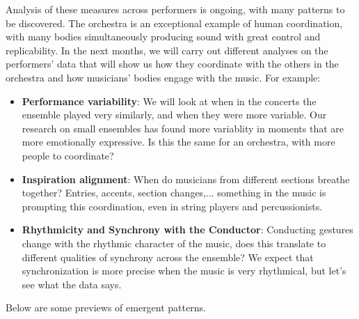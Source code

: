 Analysis of these measures across performers is ongoing, with many patterns to be discovered. The orchestra is an exceptional example of human coordination, with many bodies simultaneously producing sound with great control and replicability. In the next months, we will carry out different analyses on the performers' data that will show us how they coordinate with the others in the orchestra and how musicians' bodies engage with the music. For example: 
\begin{itemize}
\item \textbf{Performance variability}: We will look at when in the concerts the ensemble played very similarly, and when they were more variable. Our research on small ensembles has found more variablity in moments that are more emotionally expressive. Is this the same for an orchestra, with more people to coordinate?\item \textbf{Inspiration alignment}: When do musicians from different sections breathe together? Entries, accents, section changes,... something in the music is prompting this coordination, even in string players and percussionists.\item \textbf{Rhythmicity and Synchrony with the Conductor}: Conducting gestures change with the rhythmic character of the music, does this translate to different qualities of synchrony across the ensemble? We expect that synchronization is more precise when the music is very rhythmical, but let's see what the data says.
\end{itemize}

 Below are some previews of emergent patterns.
\ %
	\SepRule
